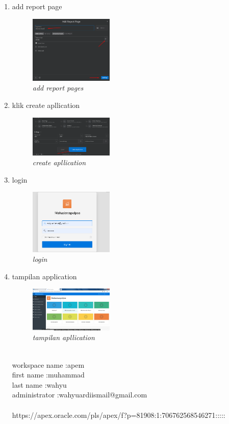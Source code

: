 \documentclass{article}
\begin{document}
\begin{enumerate}
\item add report page
    \begin{figure}[ht]
        \centerline{\includegraphics[width=4cm]{z.png}}
        \caption{\textit{add report pages}}
    \end{figure}

\item klik create apllication
    \begin{figure}[ht]
        \centerline{\includegraphics[width=4cm]{z1.png}}
        \caption{\textit{create apllication}}
    \end{figure}

\item login 
     \begin{figure}[ht]
        \centerline{\includegraphics[width=4cm]{z2.png}}
        \caption{\textit{login}}
    \end{figure}

\item tampilan application
     \begin{figure}[ht]
        \centerline{\includegraphics[width=4cm]{z3.png}}
        \caption{\textit{tampilan apllication}}
    \end{figure}
    
\newpage \\
workspace name :apem \\
first name     :muhammad \\
last name      :wahyu \\
administrator  :wahyuardiismail@gmail.com \\

\\
https://apex.oracle.com/pls/apex/f?p=81908:1:706762568546271:::::

\end{enumerate}
\end{document}
